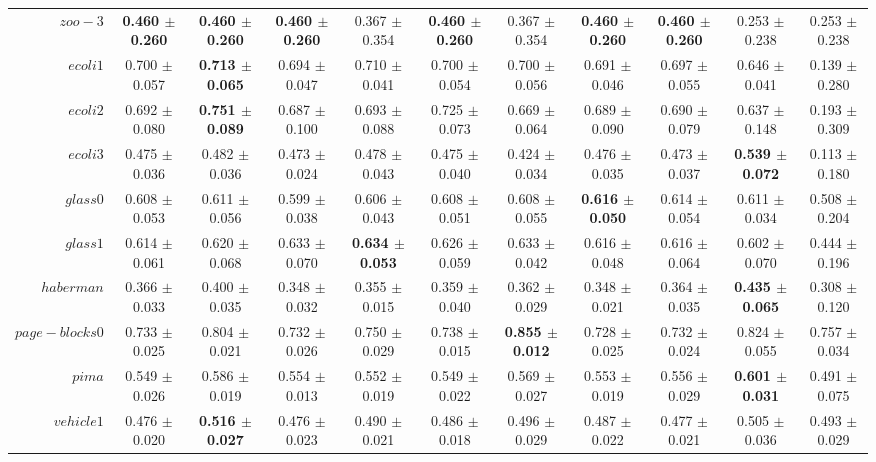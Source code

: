 \begin{table}[!ht]
{\begin{tabular}{r c c c c c c c c c c}
$zoo-3$ & \textbf{0.460 $\pm$ 0.260} & \textbf{0.460 $\pm$ 0.260} & \textbf{0.460 $\pm$ 0.260} & 0.367 $\pm$ 0.354 & \textbf{0.460 $\pm$ 0.260} & 0.367 $\pm$ 0.354 & \textbf{0.460 $\pm$ 0.260} & \textbf{0.460 $\pm$ 0.260} & 0.253 $\pm$ 0.238 & 0.253 $\pm$ 0.238 \\
$ecoli1$ & 0.700 $\pm$ 0.057 & \textbf{0.713 $\pm$ 0.065} & 0.694 $\pm$ 0.047 & 0.710 $\pm$ 0.041 & 0.700 $\pm$ 0.054 & 0.700 $\pm$ 0.056 & 0.691 $\pm$ 0.046 & 0.697 $\pm$ 0.055 & 0.646 $\pm$ 0.041 & 0.139 $\pm$ 0.280 \\
$ecoli2$ & 0.692 $\pm$ 0.080 & \textbf{0.751 $\pm$ 0.089} & 0.687 $\pm$ 0.100 & 0.693 $\pm$ 0.088 & 0.725 $\pm$ 0.073 & 0.669 $\pm$ 0.064 & 0.689 $\pm$ 0.090 & 0.690 $\pm$ 0.079 & 0.637 $\pm$ 0.148 & 0.193 $\pm$ 0.309 \\
$ecoli3$ & 0.475 $\pm$ 0.036 & 0.482 $\pm$ 0.036 & 0.473 $\pm$ 0.024 & 0.478 $\pm$ 0.043 & 0.475 $\pm$ 0.040 & 0.424 $\pm$ 0.034 & 0.476 $\pm$ 0.035 & 0.473 $\pm$ 0.037 & \textbf{0.539 $\pm$ 0.072} & 0.113 $\pm$ 0.180 \\
$glass0$ & 0.608 $\pm$ 0.053 & 0.611 $\pm$ 0.056 & 0.599 $\pm$ 0.038 & 0.606 $\pm$ 0.043 & 0.608 $\pm$ 0.051 & 0.608 $\pm$ 0.055 & \textbf{0.616 $\pm$ 0.050} & 0.614 $\pm$ 0.054 & 0.611 $\pm$ 0.034 & 0.508 $\pm$ 0.204 \\
$glass1$ & 0.614 $\pm$ 0.061 & 0.620 $\pm$ 0.068 & 0.633 $\pm$ 0.070 & \textbf{0.634 $\pm$ 0.053} & 0.626 $\pm$ 0.059 & 0.633 $\pm$ 0.042 & 0.616 $\pm$ 0.048 & 0.616 $\pm$ 0.064 & 0.602 $\pm$ 0.070 & 0.444 $\pm$ 0.196 \\
$haberman$ & 0.366 $\pm$ 0.033 & 0.400 $\pm$ 0.035 & 0.348 $\pm$ 0.032 & 0.355 $\pm$ 0.015 & 0.359 $\pm$ 0.040 & 0.362 $\pm$ 0.029 & 0.348 $\pm$ 0.021 & 0.364 $\pm$ 0.035 & \textbf{0.435 $\pm$ 0.065} & 0.308 $\pm$ 0.120 \\
$page-blocks0$ & 0.733 $\pm$ 0.025 & 0.804 $\pm$ 0.021 & 0.732 $\pm$ 0.026 & 0.750 $\pm$ 0.029 & 0.738 $\pm$ 0.015 & \textbf{0.855 $\pm$ 0.012} & 0.728 $\pm$ 0.025 & 0.732 $\pm$ 0.024 & 0.824 $\pm$ 0.055 & 0.757 $\pm$ 0.034 \\
$pima$ & 0.549 $\pm$ 0.026 & 0.586 $\pm$ 0.019 & 0.554 $\pm$ 0.013 & 0.552 $\pm$ 0.019 & 0.549 $\pm$ 0.022 & 0.569 $\pm$ 0.027 & 0.553 $\pm$ 0.019 & 0.556 $\pm$ 0.029 & \textbf{0.601 $\pm$ 0.031} & 0.491 $\pm$ 0.075 \\
$vehicle1$ & 0.476 $\pm$ 0.020 & \textbf{0.516 $\pm$ 0.027} & 0.476 $\pm$ 0.023 & 0.490 $\pm$ 0.021 & 0.486 $\pm$ 0.018 & 0.496 $\pm$ 0.029 & 0.487 $\pm$ 0.022 & 0.477 $\pm$ 0.021 & 0.505 $\pm$ 0.036 & 0.493 $\pm$ 0.029 \\

\end{tabular}}
\end{table}
